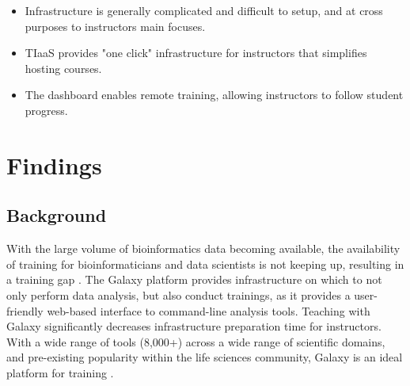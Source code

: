 \documentclass[a4paper,num-refs]{oup-contemporary}
\begin{document}
\begin{keypoints*}
\begin{itemize}
\item Infrastructure is generally complicated and difficult to setup, and at cross purposes to instructors main focuses.
\item TIaaS provides "one click" infrastructure for instructors that simplifies hosting courses.
\item The dashboard enables remote training, allowing instructors to follow student progress.
\end{itemize}
\end{keypoints*}

\section{Findings}
\subsection{Background}


With the large volume of bioinformatics data becoming available, the availability of training for bioinformaticians and data scientists is not keeping up, resulting in a training gap \cite{Attwood2017}.
The Galaxy platform \cite{afgan2018galaxy} provides infrastructure on which to not only perform data analysis, but also conduct trainings, as it provides a user-friendly web-based interface to command-line analysis tools. Teaching with Galaxy significantly decreases infrastructure preparation time for instructors. With a wide range of tools (8,000+) across a wide range of scientific domains, and pre-existing popularity within the life sciences community, Galaxy is an ideal platform for training \cite{gtn,gtn2}.
\end{document}
